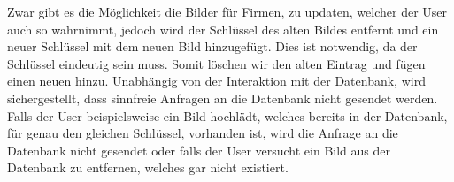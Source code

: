 Zwar gibt es die Möglichkeit die Bilder für Firmen, zu updaten, welcher der User auch so wahrnimmt, jedoch wird der Schlüssel des alten Bildes entfernt und ein neuer Schlüssel mit dem neuen Bild hinzugefügt.
Dies ist notwendig, da der Schlüssel eindeutig sein muss.
Somit löschen wir den alten Eintrag und fügen einen neuen hinzu.
Unabhängig von der Interaktion mit der Datenbank, wird sichergestellt, dass sinnfreie Anfragen an die Datenbank nicht gesendet werden.
Falls der User beispielsweise ein Bild hochlädt, welches bereits in der Datenbank, für genau den gleichen Schlüssel, vorhanden ist, wird die Anfrage an die Datenbank nicht gesendet oder falls der User versucht ein Bild aus der Datenbank zu entfernen, welches gar nicht existiert.
\newline
\newline
